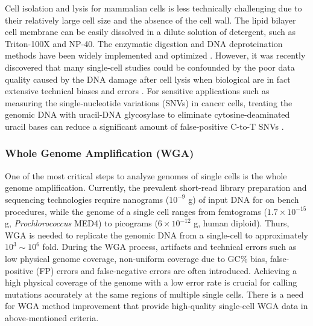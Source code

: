Cell isolation and lysis for mammalian cells is less technically challenging due to their relatively large cell size and the absence of the cell wall. The lipid bilayer cell membrane can be easily dissolved in a dilute solution of detergent, such as Triton-100X and NP-40. The enzymatic digestion and DNA deproteination methods have been widely implemented and optimized \cite{Zong:2012bs,Fu:2015gl,Leung:2016vx,Chen:2017hq,Dean:2002us}. However, it was recently discovered that many single-cell studies could be confounded by the poor data quality caused by the DNA damage after cell lysis when biological  are in fact extensive technical biases and errors \cite{Chen:2017hq,Chen:2017dq}. For sensitive applications such as measuring the single-nucleotide variations (SNVs) in cancer cells, treating the genomic DNA with uracil-DNA glycosylase to eliminate cytosine-deaminated uracil bases can reduce a significant amount of false-positive C-to-T SNVs \cite{Chen:2017hq,Rohland:2015uk}. 

\subsubsection{Whole Genome Amplification (WGA)}
One of the most critical steps to analyze genomes of single cells is the whole genome amplification. Currently, the prevalent short-read library preparation and sequencing technologies require nanograms ($10^{-9}$ g) of input DNA for on bench procedures, while the genome of a single cell ranges from femtograms ($1.7 \times 10^{-15}$ g, \textit{Prochlorococcus} MED4) to picograms ($6 \times 10^{-12}$ g, human diploid). Thurs, WGA is needed to replicate the genomic DNA from a single-cell to approximately $10^3 \sim 10^6$ fold. During the WGA process, artifacts and technical errors such as low physical genome coverage, non-uniform coverage due to GC\% bias, false-positive (FP) errors and false-negative errors are often introduced. Achieving a high physical coverage of the genome with a low error rate is crucial for calling mutations accurately at the same regions of multiple single cells. There is a need for WGA method improvement that provide high-quality single-cell WGA data in above-mentioned criteria.

